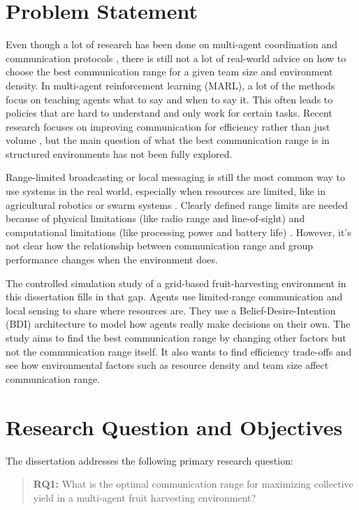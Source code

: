 \section{Problem Statement}

Even though a lot of research has been done on multi-agent coordination and communication protocols \citep{jennings1998roadmap, stone2000multiagent}, there is still not a lot of real-world advice on how to choose the best communication range for a given team size and environment density. In multi-agent reinforcement learning (MARL), a lot of the methods focus on teaching agents what to say and when to say it. This often leads to policies that are hard to understand and only work for certain tasks. Recent research focuses on improving communication for efficiency rather than just volume \citep{zhang2024}, but the main question of what the best communication range is in structured environments has not been fully explored.

Range-limited broadcasting or local messaging is still the most common way to use systems in the real world, especially when resources are limited, like in agricultural robotics or swarm systems \citep{albani2017}. Clearly defined range limits are needed because of physical limitations (like radio range and line-of-sight) and computational limitations (like processing power and battery life) \citep{martorell2024}. However, it's not clear how the relationship between communication range and group performance changes when the environment does.

The controlled simulation study of a grid-based fruit-harvesting environment in this dissertation fills in that gap. Agents use limited-range communication and local sensing to share where resources are. They use a Belief-Desire-Intention (BDI) architecture \citep{rao1995bdi, georgeff1999belief} to model how agents really make decisions on their own. The study aims to find the best communication range by changing other factors but not the communication range itself. It also wants to find efficiency trade-offs and see how environmental factors such as resource density and team size affect communication range.

\section{Research Question and Objectives}

The dissertation addresses the following primary research question:

\begin{quote}
\textbf{RQ1:} What is the optimal communication range for maximizing collective yield in a multi-agent fruit harvesting environment?
\end{quote}

